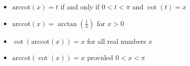 \documentclass[12pt]{ximera}
\begin{document}
\begin{theorem}
\begin{itemize}
\begin{itemize}
\item  $\mbox{arccot}(x) = t$ if and only if $0 <  t < \pi$ and $\cot(t) = x$

\item  $\mbox{arccot}(x) =\arctan\left(\frac{1}{x}\right)$ for $x > 0$

\item  $\cot\left(\mbox{arccot}(x)\right) = x$ for all real numbers $x$

\item  $\mbox{arccot}(\cot(x)) = x$ provided $0 < x < \pi$

\end{itemize}

\end{itemize}

\end{theorem}


\medskip
\end{document}
